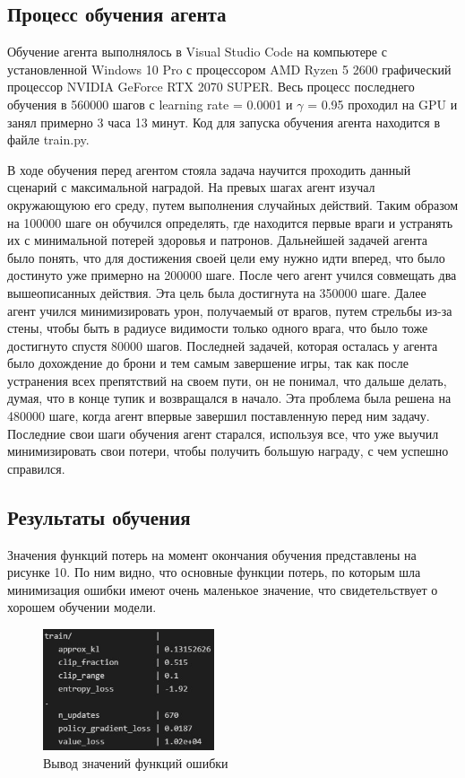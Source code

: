 \documentclass[bachelor, och, coursework]{shiza}
\begin{document}
\subsection{Процесс обучения агента}
Обучение агента выполнялось в Visual Studio Code на компьютере с установленной Windows 10 Pro с процессором AMD Ryzen 5 2600 графический процессор NVIDIA GeForce RTX 2070 SUPER.
Весь процесс последнего обучения в 560000 шагов с learning rate = 0.0001 и $\gamma$ = 0.95 проходил на GPU и занял примерно 3 часа 13 минут. Код для запуска обучения агента
находится в файле train.py.

В ходе обучения перед агентом стояла задача научится проходить данный сценарий с максимальной наградой. На превых шагах агент изучал окружающуюю его среду, путем выполнения
случайных действий. Таким образом на 100000 шаге он обучился определять, где находится первые враги и устранять их с минимальной потерей здоровья и патронов. Дальнейшей задачей
агента было понять, что для достижения своей цели ему нужно идти вперед, что было достинуто уже примерно на 200000 шаге. После чего агент учился совмещать два вышеописанных действия.
Эта цель была достигнута на 350000 шаге. Далее агент учился минимизировать урон, получаемый от врагов, путем стрельбы из-за стены, чтобы быть в радиусе видимости только одного
врага, что было тоже достигнуто спустя 80000 шагов. Последней задачей, которая осталась у агента было дохождение до брони и тем самым завершение игры, так как после устранения
всех препятствий на своем пути, он не понимал, что дальше делать, думая, что в конце тупик и возвращался в начало. Эта проблема была решена на 480000 шаге, когда агент впервые
завершил поставленную перед ним задачу. Последние свои шаги обучения агент старался, используя все, что уже выучил минимизировать свои потери, чтобы получить большую награду,
с чем успешно справился.

\subsection{Результаты обучения}
Значения функций потерь на момент окончания обучения представлены на рисунке 10. По ним видно, что основные функции потерь, по которым шла минимизация ошибки имеют очень маленькое
значение, что свидетельствует о хорошем обучении модели.

\begin{figure}[H]
    \centering
    \includegraphics[width=0.45\textwidth]{pic/11}
    \caption{Вывод значений функций ошибки}
    \label{fig:img1}
\end{figure}
\end{document}
